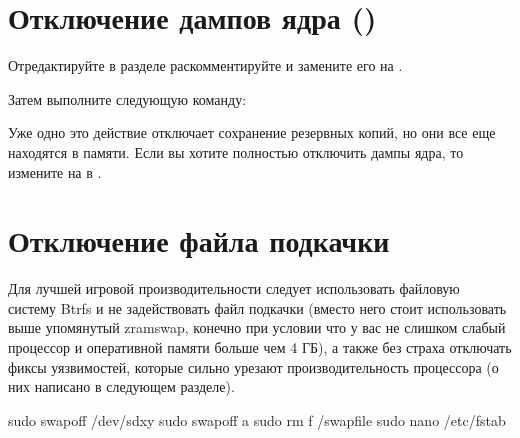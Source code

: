 \documentclass[letterpaper,10pt,russian,openany]{sphinxmanual}
\begin{document}
\ignorespaces 

\section{Отключение дампов ядра ()}
\label{\detokenize{source/extra-optimizations:disabling-kernel-dumps}}\label{\detokenize{source/extra-optimizations:index-4}}\label{\detokenize{source/extra-optimizations:id5}}
\sphinxAtStartPar
Отредактируйте  в разделе \sphinxstyleemphasis{{[}Coredump{]}} раскомментируйте  и замените его на .

\sphinxAtStartPar
Затем выполните следующую команду:

\sphinxAtStartPar
{}

\sphinxAtStartPar
Уже одно это действие отключает сохранение резервных копий, но они все еще находятся в памяти.
Если вы хотите полностью отключить дампы ядра, то измените  на  в .

\ignorespaces 

\section{Отключение файла подкачки}
\label{\detokenize{source/extra-optimizations:disabling-swap}}\label{\detokenize{source/extra-optimizations:index-5}}\label{\detokenize{source/extra-optimizations:id6}}
\sphinxAtStartPar
Для лучшей игровой производительности следует использовать файловую систему Btrfs и не задействовать файл подкачки
(вместо него стоит использовать выше упомянутый zramswap, конечно при условии что у вас не слишком слабый процессор и оперативной памяти больше чем 4 ГБ),
а также без страха отключать фиксы уязвимостей, которые сильно урезают производительность процессора (о них написано в следующем разделе).

\begin{sphinxVerbatim}[commandchars=\\\{\}]
sudo swapoff /dev/sdxy  
sudo swapoff \PYGZhy{}a         
sudo rm \PYGZhy{}f /swapfile    
sudo nano /etc/fstab    
\end{sphinxVerbatim}
\end{document}

